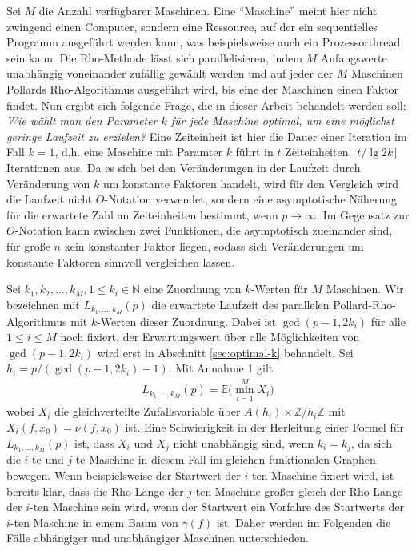 \documentclass[a4paper, 10pt, ngerman]{article}
\newcommand{\E}{\mathbb{E}}
\newcommand{\N}{\mathbb{N}}
\newcommand{\Z}{\mathbb{Z}}
\begin{document}
Sei $M$ die Anzahl verfügbarer Maschinen. Eine "`Maschine"'  meint hier nicht zwingend einen Computer, sondern eine Ressource, auf der ein sequentielles Programm ausgeführt werden kann, was beispielsweise auch ein Prozessorthread sein kann. Die Rho-Methode lässt sich parallelisieren, indem $M$ Anfangswerte unabhängig voneinander zufällig gewählt werden und auf jeder der $M$ Maschinen Pollards Rho-Algorithmus ausgeführt wird, bis eine der Maschinen einen Faktor findet. Nun ergibt sich folgende Frage, die in dieser Arbeit behandelt werden soll: \emph{Wie wählt man den Parameter $k$ für jede Maschine optimal, um eine möglichst geringe Laufzeit zu erzielen?} Eine Zeiteinheit ist hier die Dauer einer Iteration im Fall $k = 1$, d.h. eine Maschine mit Paramter $k$ führt in $t$ Zeiteinheiten $\lfloor t / \lg 2k \rfloor$ Iterationen aus. Da es sich bei den Veränderungen in der Laufzeit durch Veränderung von $k$ um konstante Faktoren handelt, wird für den Vergleich wird die Laufzeit nicht $O$-Notation verwendet, sondern eine asymptotische Näherung für die erwartete Zahl an Zeiteinheiten bestimmt, wenn $p \to \infty$. Im Gegensatz zur $O$-Notation kann zwischen zwei Funktionen, die asymptotisch zueinander sind, für große $n$ kein konstanter Faktor liegen, sodass sich Veränderungen um konstante Faktoren sinnvoll vergleichen lassen.

Sei $k_1, k_2, \dots, k_M, 1 \le k_i \in \N$ eine Zuordnung von $k$-Werten für $M$ Maschinen.  Wir bezeichnen mit $L_{k_1, \dots, k_M}(p)$ die erwartete Laufzeit des parallelen Pollard-Rho-Algorithmus mit $k$-Werten dieser Zuordnung. Dabei ist $\gcd(p - 1, 2k_i)$ für alle $1 \le i \le M$ noch fixiert, der Erwartungswert über alle Möglichkeiten von $\gcd(p - 1, 2k_i)$ wird erst in Abschnitt \ref{sec:optimal-k} behandelt. Sei $h_i = p/(\gcd(p - 1, 2k_i) - 1)$. Mit Annahme 1 gilt
\begin{align*}
    L_{k_1, \dots, k_M}(p) = \E \bigg ( \min_{i = 1}^M X_i \bigg )
\end{align*}
wobei $X_i$ die gleichverteilte Zufallsvariable über $A(h_i) \times \Z/h_i\Z$ mit $X_i(f, x_0) = \nu(f, x_0)$ ist. Eine Schwierigkeit in der Herleitung einer Formel für $L_{k_1, \dots, k_M}(p)$ ist, dass $X_i$ und $X_j$ nicht unabhängig sind, wenn $k_i = k_j$, da sich die $i$-te und $j$-te Maschine in diesem Fall im gleichen funktionalen Graphen bewegen. Wenn beispielsweise der Startwert der $i$-ten Maschine fixiert wird, ist bereits klar, dass die Rho-Länge der $j$-ten Maschine größer gleich der Rho-Länge der $i$-ten Maschine sein wird, wenn der Startwert ein Vorfahre des Startwerts der $i$-ten Maschine in einem Baum von $\gamma(f)$ ist. Daher werden im Folgenden die Fälle abhängiger und unabhängiger Maschinen unterschieden.
\end{document}
